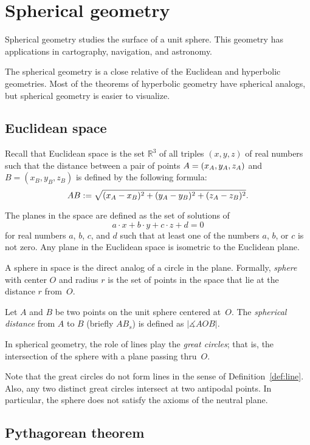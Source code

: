 \chapter{Spherical geometry}
\label{chap:sphere}

Spherical geometry studies the surface of a unit sphere.
This geometry has applications in cartography, navigation, and astronomy.

The spherical geometry is a close relative of the Euclidean and hyperbolic geometries.
Most of the theorems of hyperbolic geometry have spherical analogs,
but spherical geometry is easier to visualize. 

\section{Euclidean space}

Recall that Euclidean space is the set $\mathbb{R}^3$ of all triples $(x,y,z)$ of real numbers
such that the distance between a pair of points
$A\z=(x_A,y_A,z_A)$ and $B=(x_B,y_B,z_B)$
is defined by the following formula:
$$AB
:=
\sqrt{(x_A-x_B)^2+(y_A-y_B)^2+(z_A-z_B)^2}.$$

The planes in the space are defined as the set of solutions of 
$$a\cdot x+b\cdot y+c\cdot z+d=0$$ 
for real numbers $a$, $b$, $c$, and $d$ such that at least one of the numbers $a$, $b$, or $c$ is not zero.
Any plane in the Euclidean space is isometric to the Euclidean plane.

A sphere in space is the direct analog of a circle in the plane.
Formally, \emph{sphere} with center $O$ and radius $r$ is the set of points in the space that lie at the distance $r$ from~$O$.

Let $A$ and $B$ be two points on the unit sphere centered at~$O$.
The \emph{spherical distance} from $A$ to $B$
(briefly $AB_s$)
 is defined as  $|\measuredangle AOB|$. 

In spherical geometry, the role of lines play the \emph{great circles};
that is, the intersection of the sphere with a plane passing thru~$O$.

Note that the great circles do not form lines in the sense of Definition~\ref{def:line}.
Also, any two distinct great circles intersect at two antipodal points.
In particular, the sphere does not satisfy the axioms of the neutral plane.

\section{Pythagorean theorem}

